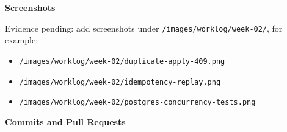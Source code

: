 \vspace{0.5em}\noindent\textbf{Screenshots}\par

Evidence pending: add screenshots under
\texttt{/\allowbreak{}images/\allowbreak{}worklog/\allowbreak{}week-\allowbreak{}02/\allowbreak{}}, for example:

\begin{itemize}
\tightlist
\item
  \texttt{/\allowbreak{}images/\allowbreak{}worklog/\allowbreak{}week-\allowbreak{}02/\allowbreak{}duplicate-\allowbreak{}apply-\allowbreak{}409.\allowbreak{}png}
\item
  \texttt{/\allowbreak{}images/\allowbreak{}worklog/\allowbreak{}week-\allowbreak{}02/\allowbreak{}idempotency-\allowbreak{}replay.\allowbreak{}png}
\item
  \texttt{/\allowbreak{}images/\allowbreak{}worklog/\allowbreak{}week-\allowbreak{}02/\allowbreak{}postgres-\allowbreak{}concurrency-\allowbreak{}tests.\allowbreak{}png}
\end{itemize}

\vspace{0.5em}\noindent\textbf{Commits and Pull
Requests}\par

